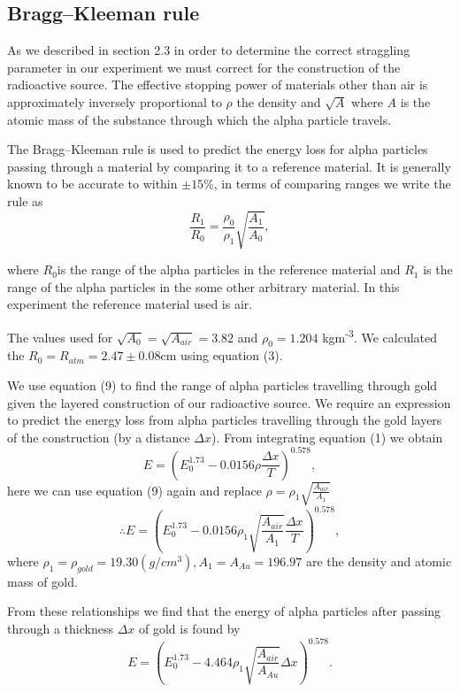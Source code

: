 \documentclass[a4paper]{article}
\begin{document}
\begin{multicols}{2}
\subsection{Bragg--Kleeman rule}
As we described in section 2.3 in order to determine the correct straggling parameter in our experiment we must correct for the construction of the radioactive source. The effective stopping power of materials other than air is approximately inversely proportional to $\rho$ the density and $\sqrt{A}$ where $A$ is the atomic mass of the substance through which the alpha particle travels.

The Bragg--Kleeman rule is used to predict the energy loss for alpha particles passing through a material by comparing it to a reference material. It is generally known to be accurate to within $\pm 15\%$\cite{SPA}, in terms of comparing ranges we write the rule as
\begin{equation} \frac{R_1}{R_0} = \frac{\rho_0}{\rho_1}\sqrt{\frac{A_1}{A_0}},
\end{equation}

where $R_0$is the range of the alpha particles in the reference material and $R_1$ is the range of the alpha particles in the some other arbitrary material.
In this experiment the reference material used is air.

The values used for $\sqrt{A_0} = \sqrt{A_{air}} = 3.82$ and $\rho_0 = 1.204$ kgm\textsuperscript{-3}\cite{SPA}. We calculated the $R_0 = R_{atm} = 2.47 \pm 0.08$cm using equation (3).

We use equation (9) to find the range of alpha particles travelling through gold given the layered construction of our radioactive source. We require an expression to predict the energy loss from alpha particles travelling through the gold layers of the construction (by a distance $\Delta x$). 
From integrating equation (1) we obtain
\begin{equation} E = \left(E_0^{1.73} -0.0156 \rho \frac{\Delta x}{T} \right)^{0.578},
\end{equation}
here we can use equation (9) again and replace $\rho =  \rho_1\sqrt{\frac{A_{air}}{A_1}}$
\begin{equation} \therefore E = \left(E_0^{1.73} - 0.0156 \rho_1\sqrt{\frac{A_{air}}{A_1}} \frac{\Delta x}{T} \right)^{0.578},
\end{equation}
where $\rho_1 = \rho_{gold} = 19.30 (g / cm^3), A_1 = A_{Au} = 196.97$ are the density and atomic mass of gold\cite{gold}.

From these relationships we find that the energy of alpha particles after passing through a thickness $\Delta x$ of gold is found by\cite{SPA}
\begin{equation} E = \left(E_0^{1.73} -4.464 \rho_1\sqrt{\frac{A_{air}}{A_{Au}}} \Delta x \right)^{0.578}.
\end{equation}




\end{multicols}
\end{document}
